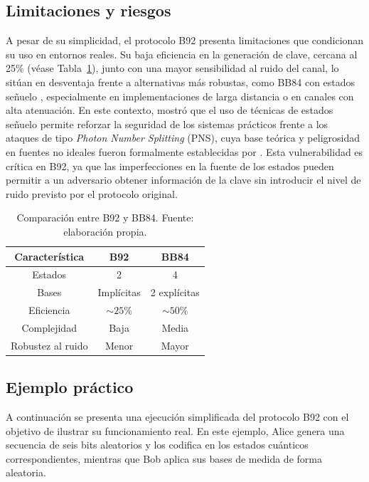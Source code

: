 
\subsection{Limitaciones y riesgos}
A pesar de su simplicidad, el protocolo B92 presenta limitaciones que condicionan su uso en entornos reales. Su baja eficiencia en la generación de clave, cercana al 25\% (véase Tabla~\ref{tab:comparativa_b92_bb84}), junto con una mayor sensibilidad al ruido del canal, lo sitúan en desventaja frente a alternativas más robustas, como BB84 con estados señuelo \citep{hwang2003,wang2005, lo2005}, especialmente en implementaciones de larga distancia o en canales con alta atenuación. En este contexto, \cite{wang2005} mostró que el uso de técnicas de estados señuelo permite reforzar la seguridad de los sistemas prácticos frente a los ataques de tipo \textit{Photon Number Splitting} (PNS), cuya base teórica y peligrosidad en fuentes no ideales fueron formalmente establecidas por \cite{brassard2000pns}. Esta vulnerabilidad es crítica en B92, ya que las imperfecciones en la fuente de los estados pueden permitir a un adversario obtener información de la clave sin introducir el nivel de ruido previsto por el protocolo original.

\begin{table}[h!]
\label{tab:comparativa_b92_bb84}
\centering
\begin{tabular}{ccc}
\hline
\textbf{Característica} & \textbf{B92} & \textbf{BB84} \\
\hline
Estados & 2 & 4 \\
Bases & Implícitas & 2 explícitas \\
Eficiencia & $\sim 25\%$ & $\sim 50\%$ \\
Complejidad & Baja & Media \\
Robustez al ruido & Menor & Mayor \\
\hline
\end{tabular}
\caption{Comparación entre B92 y BB84. Fuente: elaboración propia.}
\end{table}


\subsection{Ejemplo práctico}

A continuación se presenta una ejecución simplificada del protocolo B92 con el objetivo de ilustrar su funcionamiento real. En este ejemplo, Alice genera una secuencia de seis bits aleatorios y los codifica en los estados cuánticos correspondientes, mientras que Bob aplica sus bases de medida de forma aleatoria.


